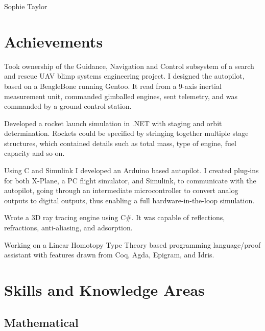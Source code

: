 \documentclass[letterpaper]{article}
\def\name{Sophie Taylor}
\renewenvironment{itemize}{
  \begin{list}{}{
    \setlength{\leftmargin}{1.5em}
  }
}{
  \end{list}
}
\begin{document}
{\huge \name}


\vspace{0.25in}

\section*{Achievements}

\begin{itemize}

\item Took ownership of the Guidance, Navigation and Control subsystem of a search and rescue UAV blimp systems engineering project. I designed the autopilot, based on a BeagleBone running Gentoo. It read from a 9-axis inertial measurement unit, commanded gimballed engines, sent telemetry, and was commanded by a ground control station.

\item Developed a rocket launch simulation in .NET with staging and orbit determination. Rockets could be specified by stringing together multiple stage structures, which contained details such as total mass, type of engine, fuel capacity and so on.

\item Using C and Simulink I developed an Arduino based autopilot. I created plug-ins for both X-Plane, a PC flight simulator, and Simulink, to communicate with the autopilot, going through an intermediate microcontroller to convert analog outputs to digital outputs, thus enabling a full hardware-in-the-loop simulation.

\item Wrote a 3D ray tracing engine using C\#. It was capable of reflections, refractions, anti-aliasing, and adsorption.

\item Working on a Linear Homotopy Type Theory based programming language/proof assistant with features drawn from Coq, Agda, Epigram, and Idris.

\end{itemize}


\section*{Skills and Knowledge Areas}

\subsection*{Mathematical}
\end{document}
